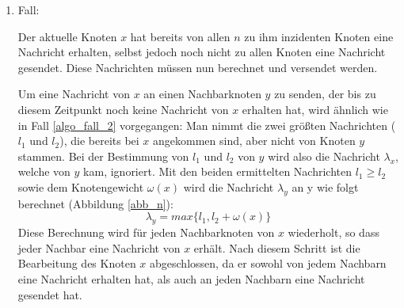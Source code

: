 \begin{enumerate}
		
	\item Fall:
	
		Der aktuelle Knoten $x$ hat bereits von allen $n$ zu ihm inzidenten Knoten eine Nachricht erhalten, selbst jedoch noch nicht zu allen Knoten eine Nachricht gesendet. Diese Nachrichten müssen nun berechnet und versendet werden.\label{labelAufUnterfall}
		
		
			
			
		
		Um eine Nachricht von $x$ an einen Nachbarknoten $y$ zu senden, der bis zu diesem Zeitpunkt noch keine Nachricht von $x$ erhalten hat, wird ähnlich wie in Fall \ref{algo_fall_2} vorgegangen: Man nimmt die zwei größten Nachrichten ($l_{1}$ und $l_{2}$), die bereits bei $x$ angekommen sind, aber nicht von Knoten $y$ stammen. Bei der Bestimmung von $l_{1}$ und $l_{2}$ von $y$ wird also die Nachricht $\lambda_{x}$, welche von $y$ kam, ignoriert. Mit den beiden ermittelten Nachrichten $l_{1} \ge l_{2}$ sowie dem Knotengewicht $\omega(x)$ wird die Nachricht $\lambda_{y}$ an y wie folgt berechnet (Abbildung \ref{abb_n}):  $$\lambda_{y} = max\{l_{1},  l_{2} + \omega(x)\}$$
		Diese Berechnung wird für jeden Nachbarknoten von $x$ wiederholt, so dass jeder Nachbar eine Nachricht von $x$ erhält. Nach diesem Schritt ist die Bearbeitung des Knoten $x$ abgeschlossen, da er sowohl von jedem Nachbarn eine Nachricht erhalten hat, als auch an jeden Nachbarn eine Nachricht gesendet hat.
		
		
		
	
		
		
\end{enumerate}

